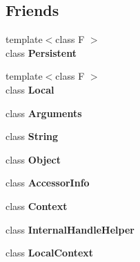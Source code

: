 \subsection*{Friends}
\begin{DoxyCompactItemize}
\item 
\hypertarget{classv8_1_1_handle_afaadbbd2553180545a4e018c3eeac71e}{}{\footnotesize template$<$class F $>$ }\\class {\bfseries Persistent}\label{classv8_1_1_handle_afaadbbd2553180545a4e018c3eeac71e}

\item 
\hypertarget{classv8_1_1_handle_afb872edb4aac7ba55f0da004113aa2b0}{}{\footnotesize template$<$class F $>$ }\\class {\bfseries Local}\label{classv8_1_1_handle_afb872edb4aac7ba55f0da004113aa2b0}

\item 
\hypertarget{classv8_1_1_handle_acbd2a21b98cd2cb694fd02340724b625}{}class {\bfseries Arguments}\label{classv8_1_1_handle_acbd2a21b98cd2cb694fd02340724b625}

\item 
\hypertarget{classv8_1_1_handle_a7fb804f7dc96dd9f705c84095f37f1ca}{}class {\bfseries String}\label{classv8_1_1_handle_a7fb804f7dc96dd9f705c84095f37f1ca}

\item 
\hypertarget{classv8_1_1_handle_a0720b5f434e636e22a3ed34f847eec57}{}class {\bfseries Object}\label{classv8_1_1_handle_a0720b5f434e636e22a3ed34f847eec57}

\item 
\hypertarget{classv8_1_1_handle_aa6da8bc2cce791f1f1358707f98c45d1}{}class {\bfseries Accessor\+Info}\label{classv8_1_1_handle_aa6da8bc2cce791f1f1358707f98c45d1}

\item 
\hypertarget{classv8_1_1_handle_ac26c806e60ca4a0547680edb68f6e39b}{}class {\bfseries Context}\label{classv8_1_1_handle_ac26c806e60ca4a0547680edb68f6e39b}

\item 
\hypertarget{classv8_1_1_handle_a4d886c8e6d4c47ae9d59f6d878048580}{}class {\bfseries Internal\+Handle\+Helper}\label{classv8_1_1_handle_a4d886c8e6d4c47ae9d59f6d878048580}

\item 
\hypertarget{classv8_1_1_handle_ae34f528093f2fad464ce37f6e64c763d}{}class {\bfseries Local\+Context}\label{classv8_1_1_handle_ae34f528093f2fad464ce37f6e64c763d}


\end{DoxyCompactItemize}

